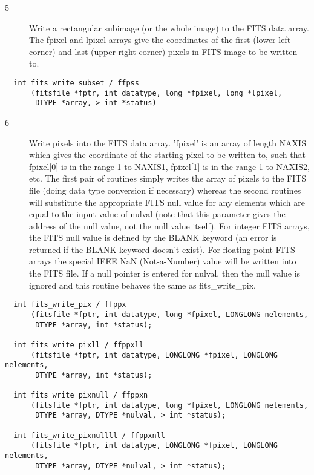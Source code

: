 \documentclass[11pt]{book}
\begin{document}
\begin{description}
\item[5 ] Write a rectangular subimage (or the whole image) to the FITS data
    array.  The fpixel and lpixel arrays give the coordinates of the
    first (lower left corner) and last (upper right corner) pixels in
   FITS image to be written to.  \label{ffpss}
\end{description}

\begin{verbatim}
  int fits_write_subset / ffpss
      (fitsfile *fptr, int datatype, long *fpixel, long *lpixel,
       DTYPE *array, > int *status)
\end{verbatim}

\begin{description}
\item[6 ] Write pixels into the FITS data array.  'fpixel' is an array of
   length NAXIS which gives the coordinate of the starting pixel to be
   written to, such that fpixel[0] is in the range 1 to NAXIS1,
   fpixel[1] is in the range 1 to NAXIS2, etc.  The first pair of routines
   simply writes the array of pixels to the FITS file (doing data type
   conversion if necessary) whereas the second routines will substitute
   the  appropriate FITS null value for any elements which are equal to
   the input value of nulval (note that this parameter gives the
   address of the null value, not the null value itself).  For integer
   FITS arrays, the FITS null value is defined by the BLANK keyword (an
   error is returned if the BLANK keyword doesn't exist).  For floating
   point FITS arrays  the special IEEE NaN (Not-a-Number) value will be
   written into the FITS file.  If a null pointer is entered for
   nulval, then the null value is ignored and this routine behaves
  the same as fits\_write\_pix.   \label{ffppx} \label{ffppxn}
\end{description}

\begin{verbatim}
  int fits_write_pix / ffppx
      (fitsfile *fptr, int datatype, long *fpixel, LONGLONG nelements,
       DTYPE *array, int *status);

  int fits_write_pixll / ffppxll
      (fitsfile *fptr, int datatype, LONGLONG *fpixel, LONGLONG nelements,
       DTYPE *array, int *status);

  int fits_write_pixnull / ffppxn
      (fitsfile *fptr, int datatype, long *fpixel, LONGLONG nelements,
       DTYPE *array, DTYPE *nulval, > int *status);

  int fits_write_pixnullll / ffppxnll
      (fitsfile *fptr, int datatype, LONGLONG *fpixel, LONGLONG nelements,
       DTYPE *array, DTYPE *nulval, > int *status);
\end{verbatim}
\end{document}
